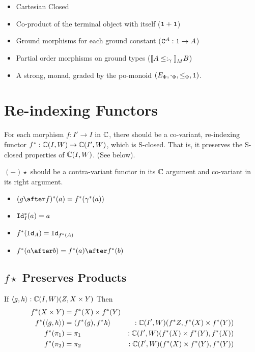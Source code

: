 \documentclass{report}
\begin{document}
\begin{itemize}
    \item Cartesian Closed
    \item Co-product of the terminal object with itself ($\texttt{1} + \texttt{1}$)
    \item Ground morphisms for each ground constant ($\texttt{C}^{A}: \texttt{1}\rightarrow A$)
    \item Partial order morphisms on ground types (${\bf [\![}A\leq:_\gamma{\bf ]\!]}_M B$)
    \item A strong, monad, graded by the po-monoid $(E_\Phi, \cdot_\Phi, \leq_{\Phi}, \texttt{1})$.
\end{itemize}

\section{Re-indexing Functors}

For each morphism $f: I' \rightarrow I$ in $\mathbb{C}$, there should be a co-variant, re-indexing functor  $f^*: \mathbb{C}(I, W) \rightarrow \mathbb{C}(I', W)$, which is S-closed. That is, it preserves the S-closed properties of $\mathbb{C}(I, W)$. (See below).

$(-)\star$ should be a contra-variant functor in its $\mathbb{C}$ argument and co-variant in its right argument.

\begin{itemize}
    \item $(g\after f)\star(a) = f\star(\g\star(a))$
    \item $\texttt{Id}_{I}^*(a) = a$
    \item $f^*(\texttt{Id}_{A}) = \texttt{Id}_{f^*(A)}$
    \item $f\star(a\after b) = f\star(a)\after f\star(b)$
\end{itemize}

\subsection{$f\star$ Preserves Products}
If $\left\langle g, h\right\rangle:\mathbb{C}(I, W)(Z, X\times Y)$
Then 
\begin{align}
    f^*(X\times Y) & = f^*(X)\times f^*(Y)\\
    f^*(\left\langle g, h\right\rangle) & = \left\langle f^*(g), f^*{h}\right\rangle&:\mathbb{C}(I', W)(f^* Z, f^*(X)\times f^*(Y))\\
    f^*(\pi_1) & = \pi_1&:\mathbb{C}(I', W)(f^*(X)\times f^*(Y), f^*(X)) \\
    f^*(\pi_2) &= \pi_2&:\mathbb{C}(I', W)(f^*(X)\times f^*(Y), f^*(Y))
\end{align}
\end{document}
